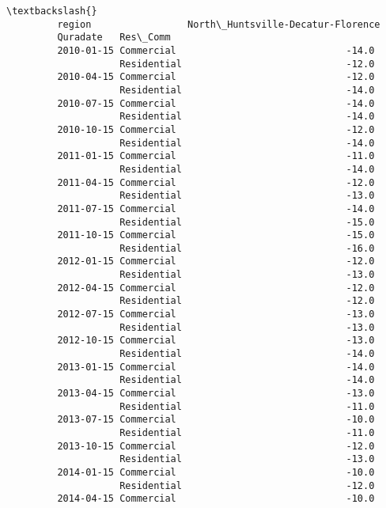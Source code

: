 \documentclass[11pt]{article}
\begin{document}
\begin{Verbatim}[commandchars=\\\{\}]
                                                                   \textbackslash{}
         region                 North\_Huntsville-Decatur-Florence   
         Quradate   Res\_Comm                                        
         2010-01-15 Commercial                              -14.0   
                    Residential                             -12.0   
         2010-04-15 Commercial                              -12.0   
                    Residential                             -14.0   
         2010-07-15 Commercial                              -14.0   
                    Residential                             -14.0   
         2010-10-15 Commercial                              -12.0   
                    Residential                             -14.0   
         2011-01-15 Commercial                              -11.0   
                    Residential                             -14.0   
         2011-04-15 Commercial                              -12.0   
                    Residential                             -13.0   
         2011-07-15 Commercial                              -14.0   
                    Residential                             -15.0   
         2011-10-15 Commercial                              -15.0   
                    Residential                             -16.0   
         2012-01-15 Commercial                              -12.0   
                    Residential                             -13.0   
         2012-04-15 Commercial                              -12.0   
                    Residential                             -12.0   
         2012-07-15 Commercial                              -13.0   
                    Residential                             -13.0   
         2012-10-15 Commercial                              -13.0   
                    Residential                             -14.0   
         2013-01-15 Commercial                              -14.0   
                    Residential                             -14.0   
         2013-04-15 Commercial                              -13.0   
                    Residential                             -11.0   
         2013-07-15 Commercial                              -10.0   
                    Residential                             -11.0   
         2013-10-15 Commercial                              -12.0   
                    Residential                             -13.0   
         2014-01-15 Commercial                              -10.0   
                    Residential                             -12.0   
         2014-04-15 Commercial                              -10.0   

\end{Verbatim}
\end{document}

